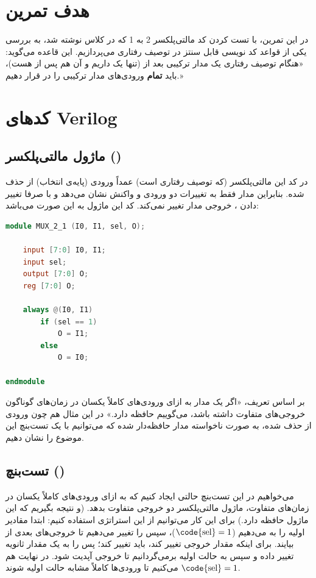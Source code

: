 \section{هدف تمرین}
در این تمرین، با تست کردن کد مالتی‌پلکسر 2 به 1 که در کلاس نوشته شد، به بررسی یکی از قواعد کد نویسی قابل سنتز در توصیف رفتاری می‌پردازیم. این قاعده می‌گوید: «هنگام توصیف رفتاری یک مدار ترکیبی بعد از  (تنها یک  داریم و آن هم پس از  هست)، باید \textbf{تمام} ورودی‌های مدار ترکیبی را در  قرار دهیم.»

\section{کدهای Verilog}

\subsection{ماژول مالتی‌پلکسر ()}
در کد این مالتی‌پلکسر (که توصیف رفتاری است) عمداً ورودی  (پایه‌ی انتخاب) از  حذف شده. بنابراین مدار فقط به تغییرات دو ورودی  و  واکنش نشان می‌دهد و با صرفا تغییر دادن ، خروجی مدار تغییر نمی‌کند. کد این ماژول به این صورت می‌باشد:

\begin{latin}
    \begin{lstlisting}[language=Verilog]
module MUX_2_1 (I0, I1, sel, O);

    input [7:0] I0, I1;
    input sel;
    output [7:0] O;
    reg [7:0] O;

    always @(I0, I1)
        if (sel == 1)
            O = I1;
        else
            O = I0;

endmodule
\end{lstlisting}
\end{latin}

بر اساس تعریف، «اگر یک مدار به ازای ورودی‌های کاملاً یکسان در زمان‌های گوناگون خروجی‌های متفاوت داشته باشد، می‌گوییم حافظه دارد.» در این مثال هم چون ورودی  از  حذف شده، به صورت ناخواسته مدار حافظه‌دار شده که می‌توانیم با یک تست‌بنچ این موضوع را نشان دهیم.

\subsection{تست‌بنچ ()}
می‌خواهیم در این تست‌بنچ حالتی ایجاد کنیم که به ازای ورودی‌های کاملاً یکسان در زمان‌های متفاوت، ماژول مالتی‌پلکسر دو خروجی متفاوت بدهد. (و نتیجه بگیریم که این ماژول حافظه دارد.) برای این کار می‌توانیم از این استراتژی استفاده کنیم: ابتدا مقادیر اولیه را به  می‌دهیم ($\text{\code{sel}}=1$)، سپس  را تغییر می‌دهیم تا خروجی‌های بعدی از  بیایند. برای اینکه مقدار خروجی تغییر کند، باید  تغییر کند؛ پس  را به یک مقدار ثانویه تغییر داده و سپس به حالت اولیه برمی‌گردانیم تا خروجی آپدیت شود. در نهایت هم $\text{\code{sel}}=1$ می‌کنیم تا ورودی‌ها کاملاً مشابه حالت اولیه شوند.

